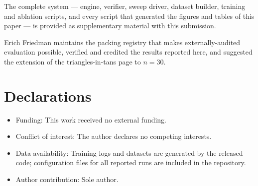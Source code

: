 \documentclass[pdflatex,sn-mathphys-num]{sn-jnl}
\theoremstyle{thmstyleone}%
\begin{document}
\backmatter

The complete system --- engine, verifier, sweep driver, dataset builder,
training and ablation scripts, and every script that generated the figures
and tables of this paper --- is provided as supplementary material with
this submission.

Erich Friedman maintains the packing registry that makes
externally-audited evaluation possible, verified and credited the results
reported here, and suggested the extension of the triangles-in-tans page
to $n = 30$.

\section*{Declarations}

\begin{itemize}
\item Funding: This work received no external funding.
\item Conflict of interest: The author declares no competing interests.
\item Data availability: Training logs and datasets are generated by the
released code; configuration files for all reported runs are included in the
repository.
\item Author contribution: Sole author.
\end{itemize}
\end{document}
